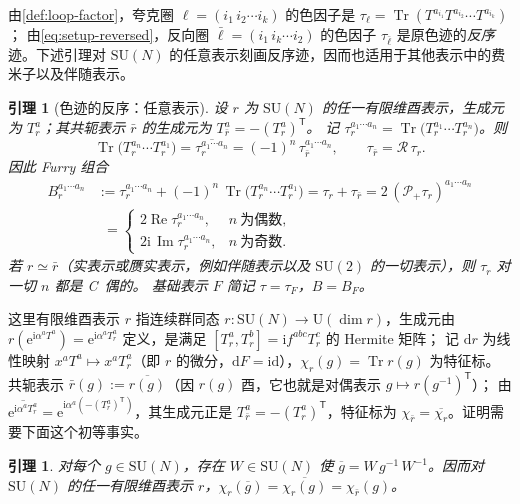 \documentclass[UTF8,a4paper,11pt,fontset=fandol]{ctexart}
\theoremstyle{cplain}
\newtheorem{lemma}[theorem]{引理}
\theoremstyle{cdefinition}
\theoremstyle{cremark}
\numberwithin{equation}{section}
\DeclareMathOperator{\Tr}{Tr}
\DeclareMathOperator{\Real}{Re}
\DeclareMathOperator{\Imag}{Im}
\newcommand{\dd}{\mathrm{d}}                         %
\newcommand{\tp}{\mathsf{T}}                         %
\newcommand{\Rop}{\mathcal{R}}                       %
\newcommand{\Pp}{\mathcal{P}_{+}}                    %
\newcommand{\ii}{\mathrm{i}}                        %
\newcommand{\ee}{\mathrm{e}}                        %
\begin{document}
由\cref{def:loop-factor}，夸克圈 $\ell=(i_1\,i_2\cdots i_k)$ 的色因子是 $\tau_\ell=\Tr(T^{a_{i_1}}T^{a_{i_2}}\cdots T^{a_{i_k}})$；
由\cref{eq:setup-reversed}，反向圈 $\bar\ell=(i_1\,i_k\cdots i_2)$ 的色因子 $\tau_{\bar\ell}$ 是原色迹的\emph{反序}迹。下述引理对 $\mathrm{SU}(N)$ 的任意表示刻画反序迹，因而也适用于其他表示中的费米子以及伴随表示。

\begin{lemma}[色迹的反序：任意表示]\label{lem:color-reversal}
设 $r$ 为 $\mathrm{SU}(N)$ 的任一有限维酉表示，生成元为 $T_r^a$；其共轭表示 $\bar r$ 的生成元为 $T_{\bar r}^a=-(T_r^a)^{\tp}$。
记 $\tau_r^{a_1\cdots a_n}=\Tr\bigl(T_r^{a_1}\cdots T_r^{a_n}\bigr)$。则
\begin{equation}\label{eq:color-reversal}
\Tr\bigl(T_r^{a_n}\cdots T_r^{a_1}\bigr)=\overline{\tau_r^{a_1\cdots a_n}}=(-1)^n\,\tau_{\bar r}^{a_1\cdots a_n},
\qquad \tau_{\bar r}=\Rop\,\tau_r .
\end{equation}
因此 Furry 组合
\begin{equation}\label{eq:bracket}
\begin{aligned}
B_r^{a_1\cdots a_n}&:=\tau_r^{a_1\cdots a_n}+(-1)^n\,\Tr\bigl(T_r^{a_n}\cdots T_r^{a_1}\bigr)=\tau_r+\tau_{\bar r}=2\,(\Pp\tau_r)^{a_1\cdots a_n}\\
&\phantom{:}=\begin{cases}2\Real\tau_r^{a_1\cdots a_n}, & n\ \text{为偶数},\\[2pt] 2\ii\,\Imag\tau_r^{a_1\cdots a_n}, & n\ \text{为奇数}.\end{cases}
\end{aligned}
\end{equation}
若 $r\simeq\bar r$（实表示或赝实表示，例如伴随表示以及 $\mathrm{SU}(2)$ 的一切表示），则 $\tau_r$ 对一切 $n$ 都是 C~偶的。
基础表示 $F$ 简记 $\tau=\tau_F$，$B=B_F$。
\end{lemma}

这里有限维酉表示 $r$ 指连续群同态 $r:\mathrm{SU}(N)\to\mathrm U(\dim r)$，生成元由 $r(\ee^{\ii\alpha^aT^a})=\ee^{\ii\alpha^aT_r^a}$ 定义，是满足 $[T_r^a,T_r^b]=\ii f^{abc}T_r^c$ 的 Hermite 矩阵；
记 $\dd r$ 为线性映射 $x^aT^a\mapsto x^aT_r^a$（即 $r$ 的微分，$\dd F=\mathrm{id}$），$\chi_r(g)=\Tr r(g)$ 为特征标。共轭表示 $\bar r(g):=\overline{r(g)}$（因 $r(g)$ 酉，它也就是对偶表示 $g\mapsto r(g^{-1})^{\tp}$）；
由 $\overline{\ee^{\ii\alpha^aT_r^a}}=\ee^{\ii\alpha^a(-(T_r^a)^{\tp})}$，其生成元正是 $T_{\bar r}^a=-(T_r^a)^{\tp}$，特征标为 $\chi_{\bar r}=\overline{\chi_r}$。证明需要下面这个初等事实。

\begin{lemma}\label{lem:color-conjugacy}
对每个 $g\in\mathrm{SU}(N)$，存在 $W\in\mathrm{SU}(N)$ 使 $\overline g=W\,g^{-1}\,W^{-1}$。因而对 $\mathrm{SU}(N)$ 的任一有限维酉表示 $r$，$\chi_r(\overline g)=\overline{\chi_r(g)}=\chi_{\bar r}(g)$。
\end{lemma}
\end{document}
